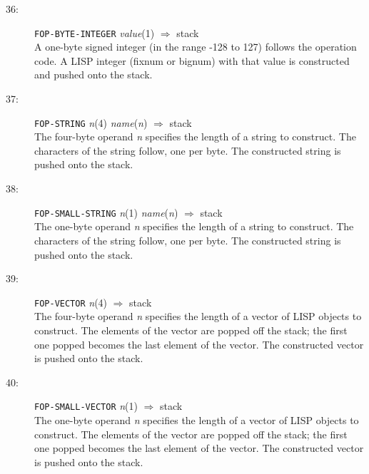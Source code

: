 \begin{description}
\item[36:] \hspace{2em} {\tt FOP-BYTE-INTEGER} \hspace{2em} {\it value}(1) \hspace{2em} $\Rightarrow$ \hspace{2em} stack \\
A one-byte signed integer (in the range -128 to 127) follows the
operation code.  A LISP integer (fixnum or bignum) with that value
is constructed and pushed onto the stack.

\item[37:] \hspace{2em} {\tt FOP-STRING} \hspace{2em} {\it n}(4) \hspace{2em} {\it name}({\it n})
\hspace{2em} $\Rightarrow$ \hspace{2em} stack \\
The four-byte operand {\it n} specifies the length of a string to
construct.  The characters of the string follow, one per byte.
The constructed string is pushed onto the stack.

\item[38:] \hspace{2em} {\tt FOP-SMALL-STRING} \hspace{2em} {\it n}(1) \hspace{2em} {\it name}({\it n}) \hspace{2em} $\Rightarrow$ \hspace{2em} stack \\
The one-byte operand {\it n} specifies the length of a string to
construct.  The characters of the string follow, one per byte.
The constructed string is pushed onto the stack.

\item[39:] \hspace{2em} {\tt FOP-VECTOR} \hspace{2em} {\it n}(4) \hspace{2em} $\Rightarrow$ \hspace{2em} stack \\
The four-byte operand {\it n} specifies the length of a vector of LISP objects
to construct.  The elements of the vector are popped off the stack;
the first one popped becomes the last element of the vector.
The constructed vector is pushed onto the stack.

\item[40:] \hspace{2em} {\tt FOP-SMALL-VECTOR} \hspace{2em} {\it n}(1) \hspace{2em} $\Rightarrow$ \hspace{2em} stack \\
The one-byte operand {\it n} specifies the length of a vector of LISP objects
to construct.  The elements of the vector are popped off the stack;
the first one popped becomes the last element of the vector.
The constructed vector is pushed onto the stack.


\end{description}
